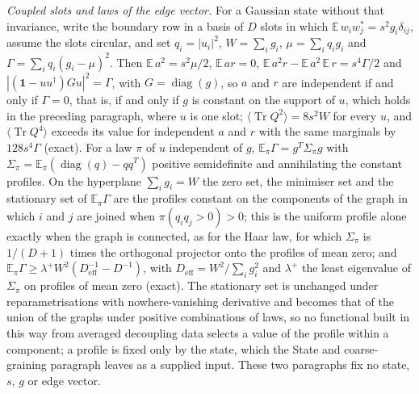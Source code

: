 \emph{Coupled slots and laws of the edge vector.} For a Gaussian state without that invariance, write the boundary row in a basis of \(D\) slots in which \(\mathbb{E}\,w_{i}w_{j}^{*}=s^{2}g_{i}\delta_{ij}\), assume the slots circular, and set \(q_{i}=|u_{i}|^{2}\), \(W=\sum_{i}g_{i}\), \(\mu=\sum_{i}q_{i}g_{i}\) and \(\Gamma=\sum_{i}q_{i}(g_{i}-\mu)^{2}\). Then \(\mathbb{E}\,a^{2}=s^{2}\mu/2\), \(\mathbb{E}\,ar=0\), \(\mathbb{E}\,a^{2}r-\mathbb{E}\,a^{2}\,\mathbb{E}\,r=s^{4}\Gamma/2\) and \(|(\mathbf 1-uu^{\dagger})Gu|^{2}=\Gamma\), with \(G=\operatorname{diag}(g)\), so \(a\) and \(r\) are independent if and only if \(\Gamma=0\), that is, if and only if \(g\) is constant on the support of \(u\), which holds in the preceding paragraph, where \(u\) is one slot; \(\langle\operatorname{Tr}Q^{2}\rangle=8s^{2}W\) for every \(u\), and \(\langle\operatorname{Tr}Q^{4}\rangle\) exceeds its value for independent \(a\) and \(r\) with the same marginals by \(128s^{4}\Gamma\) (exact). For a law \(\pi\) of \(u\) independent of \(g\), \(\mathbb{E}_{\pi}\Gamma=g^{T}\Sigma_{\pi}g\) with \(\Sigma_{\pi}=\mathbb{E}_{\pi}(\operatorname{diag}(q)-qq^{T})\) positive semidefinite and annihilating the constant profiles. On the hyperplane \(\sum_{i}g_{i}=W\) the zero set, the minimiser set and the stationary set of \(\mathbb{E}_{\pi}\Gamma\) are the profiles constant on the components of the graph in which \(i\) and \(j\) are joined when \(\pi(q_{i}q_{j}>0)>0\); this is the uniform profile alone exactly when the graph is connected, as for the Haar law, for which \(\Sigma_{\pi}\) is \(1/(D+1)\) times the orthogonal projector onto the profiles of mean zero; and \(\mathbb{E}_{\pi}\Gamma\ge\lambda^{+}W^{2}(D_{\mathrm{eff}}^{-1}-D^{-1})\), with \(D_{\mathrm{eff}}=W^{2}/\sum_{i}g_{i}^{2}\) and \(\lambda^{+}\) the least eigenvalue of \(\Sigma_{\pi}\) on profiles of mean zero (exact). The stationary set is unchanged under reparametrisations with nowhere-vanishing derivative and becomes that of the union of the graphs under positive combinations of laws, so no functional built in this way from averaged decoupling data selects a value of the profile within a component; a profile is fixed only by the state, which the State and coarse-graining paragraph leaves as a supplied input. These two paragraphs fix no state, \(s\), \(g\) or edge vector.

